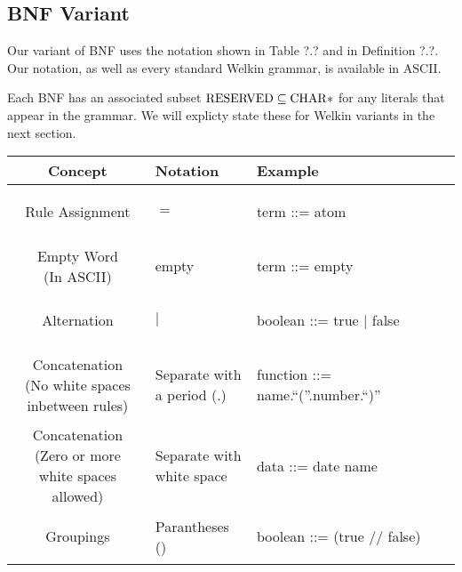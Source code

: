 \subsection{BNF Variant}
Our variant of BNF uses the notation shown in Table ?.? and in Definition ?.?. Our notation, as well as every standard Welkin grammar, is available in ASCII.

Each BNF has an associated subset $\mathrm{RESERVED} \subseteq \mathrm{CHAR}*$ for any literals that appear in the grammar. We will explicty state these for Welkin variants in the next section.

\begin{center}
  \begin{tabular}{ | c | p{2cm} | p{6cm} | }
  \hline
  \textbf{Concept} & \textbf{Notation} & \textbf{Example} \\
  \hline
  Rule Assignment & $=$ & \begin{bnf} term ::= atom\end{bnf}\\
  \hline
  \makecell{Empty Word \\ (In ASCII)} & empty & \begin{bnf} term ::= empty\end{bnf}\\
  \hline
  Alternation & $|$ & \begin{bnf} boolean ::= true | false \end{bnf}\\
  \hline
  \makecell{Concatenation \\ (No white spaces \\ inbetween rules)} & \makecell{Separate with \\  a period (.)}&  \begin{bnf} function ::= name.``(''.number.``)''\end{bnf} \\
  \hline
  \makecell{Concatenation \\ (Zero or more \\ white spaces allowed)} & \makecell{Separate with \\ white space} & \begin{bnf} data ::= date name\end{bnf} \\
  \hline
  Groupings & Parantheses () & \begin{bnf} boolean ::= (true // false)\end{bnf} \\

\end{tabular}
\end{center}
